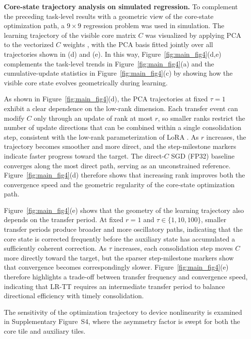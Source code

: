 \documentclass[AMA,LATO2COL]{WileyNJDv5}
\begin{document}
\noindent\textbf{Core-state trajectory analysis on simulated regression.}
To complement the preceding task-level results with a geometric view of the core-state optimization path, a \(9\times9\) regression problem was used in simulation. The learning trajectory of the visible core matrix \(C\) was visualized by applying PCA to the vectorized \(C\) weights \cite{lorch2016visualizing,li2018visualizing}, with the PCA basis fitted jointly over all trajectories shown in (d) and (e). In this way, Figure~\ref{fig:main_fig4}(d,e) complements the task-level trends in Figure~\ref{fig:main_fig4}(a) and the cumulative-update statistics in Figure~\ref{fig:main_fig4}(c) by showing how the visible core state evolves geometrically during learning.

As shown in Figure~\ref{fig:main_fig4}(d), the PCA trajectories at fixed \(\tau=1\) exhibit a clear dependence on the low-rank dimension. Each transfer event can modify \(C\) only through an update of rank at most \(r\), so smaller ranks restrict the number of update directions that can be combined within a single consolidation step, consistent with the low-rank parameterization of LoRA \cite{hu2021lora}. As \(r\) increases, the trajectory becomes smoother and more direct, and the step-milestone markers indicate faster progress toward the target. The direct-\(C\) SGD (FP32) baseline converges along the most direct path, serving as an unconstrained reference. Figure~\ref{fig:main_fig4}(d) therefore shows that increasing rank improves both the convergence speed and the geometric regularity of the core-state optimization path.

Figure~\ref{fig:main_fig4}(e) shows that the geometry of the learning trajectory also depends on the transfer period. At fixed \(r=1\) and \(\tau\in\{1,10,100\}\), smaller transfer periods produce broader and more oscillatory paths, indicating that the core state is corrected frequently before the auxiliary state has accumulated a sufficiently coherent correction. As \(\tau\) increases, each consolidation step moves \(C\) more directly toward the target, but the sparser step-milestone markers show that convergence becomes correspondingly slower. Figure~\ref{fig:main_fig4}(e) therefore highlights a trade-off between transfer frequency and convergence speed, indicating that LR-TT requires an intermediate transfer period to balance directional efficiency with timely consolidation.

The sensitivity of the optimization trajectory to device nonlinearity is examined in Supplementary Figure~S4, where the asymmetry factor is swept for both the core tile and auxiliary tiles.
\end{document}
